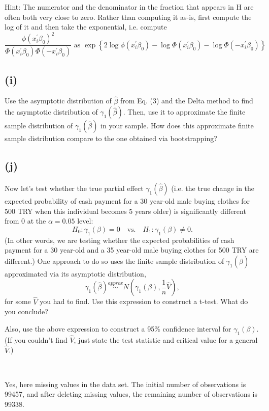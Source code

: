 \documentclass[a4paper,12pt]{article} %
\theoremstyle{nonitalic}
\newenvironment{solution}[1]
  {\renewcommand\theinnercustomsol{#1}\innercustomsol}
  {\endinnercustomsol}
\newcounter{solutionctr}[section]
\renewcommand{\thesolutionctr}{(\alph{solutionctr})}
\newenvironment{autosolution}
  {\stepcounter{solutionctr}\begin{solution}{\thesolutionctr}}
  {\end{solution}}
\begin{document}
Hint: The numerator and the denominator in the fraction that appears in H are often both
very close to zero. Rather than computing it as-is, first compute the log of it and then take
the exponential, i.e. compute 
\[
\frac{\phi(x_i^{\prime} \beta_0)^2}{\Phi(x_i^{\prime} \beta_0)\Phi(-x_i^{\prime} \beta_0)} \text{ as } \exp\left\{ 2\log \phi(x_{i}^{\prime} \beta_0) - \log \Phi(x_i^{\prime} \beta_0) - \log \Phi(-x_i^{\prime} \beta_0) \right\}
\]

\subsection*{(i)}
Use the asymptotic distribution of $\hat{\beta}$ from Eq. (3) and the Delta method to find the asymptotic distribution of $\gamma_1(\hat{\beta})$. Then, use it to approximate the finite sample distribution of $\gamma_1(\hat{\beta})$ in your sample. How does this approximate finite sample distribution compare to the one obtained via bootstrapping?

\subsection*{(j)}
Now let's test whether the true partial effect $\gamma_1(\hat{\beta})$ (i.e. the true change in the expected probability of cash payment for a 30 year-old male buying clothes for 500 TRY when this individual becomes 5 years older) is significantly different from 0 at the $\alpha = 0.05$ level:
\[
H_0 : \gamma_1(\beta) = 0 \quad \text{vs.} \quad H_1 : \gamma_1(\beta) \neq 0 .
\]
(In other words, we are testing whether the expected probabilities of cash payment for a 30 year-old and a 35 year-old male buying clothes for 500 TRY are different.) One approach to do so uses the finite sample distribution of $\gamma_1(\hat{\beta})$ approximated via its asymptotic distribution,
\[
\gamma_1(\hat{\beta}) \overset{approx}{\sim} N\left( \gamma_1(\beta), \frac{1}{n} \hat{V} \right),
\]
for some $\hat{V}$ you had to find. Use this expression to construct a t-test. What do you conclude?

Also, use the above expression to construct a 95\% confidence interval for $\gamma_1(\beta)$. (If you couldn't find $\hat{V}$, just state the test statistic and critical value for a general $\hat{V}$.)

\begin{autosolution}
    \ 

    Yes, here missing values in the data set.
    The initial number of observations is 99457,
    and after deleting missing values,
    the remaining number of observations is 99338.
\end{autosolution}
\end{document}
